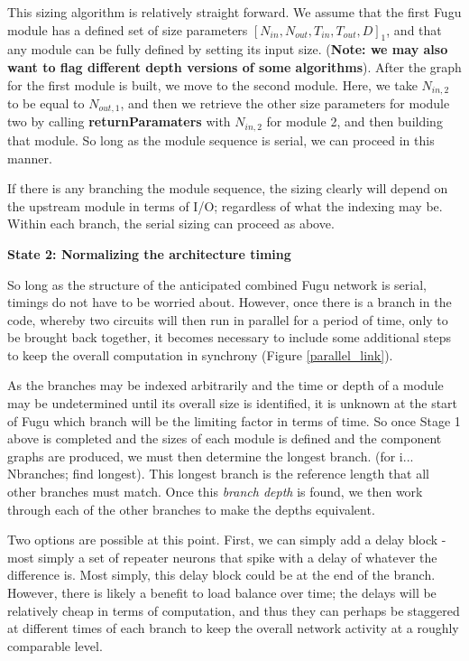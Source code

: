 \documentclass{article}
\begin{document}
This sizing algorithm is relatively straight forward.  We assume that the first Fugu module has a defined set of size parameters $[N_{in}, N_{out}, T_{in}, T_{out}, D]_1$, and that any module can be fully defined by setting its input size.  (\textbf{Note: we may also want to flag different depth versions of some algorithms}).  After the graph for the first module is built, we move to the second module.  Here, we take $N_{in,2}$ to be equal to $N_{out,1}$, and then we retrieve the other size parameters for module two by calling \textbf{returnParamaters} with $N_{in,2}$ for module 2, and then building that module.  So long as the module sequence is serial, we can proceed in this manner.  

If there is any branching the module sequence, the sizing clearly will depend on the upstream module in terms of I/O; regardless of what the indexing may be.  Within each branch, the serial sizing can proceed as above.  

\textbf{State 2: Normalizing the architecture timing}

So long as the structure of the anticipated combined Fugu network is serial, timings do not have to be worried about.  However, once there is a branch in the code, whereby two circuits will then run in parallel for a period of time, only to be brought back together, it becomes necessary to include some additional steps to keep the overall computation in synchrony (Figure \ref{parallel_link}).

As the branches may be indexed arbitrarily and the time or depth of a module may be undetermined until its overall size is identified, it is unknown at the start of Fugu which branch will be the limiting factor in terms of time.  So once Stage 1 above is completed and the sizes of each module is defined and the component graphs are produced, we must then determine the longest branch. (for i... Nbranches; find longest).  This longest branch is the reference length that all other branches must match.  Once this \textit{branch depth} is found, we then work through each of the other branches to make the depths equivalent.

Two options are possible at this point.  First, we can simply add a delay block - most simply a set of repeater neurons that spike with a delay of whatever the difference is.  Most simply, this delay block could be at the end of the branch. However, there is likely a benefit to load balance over time; the delays will be relatively cheap in terms of computation, and thus they can perhaps be staggered at different times of each branch to keep the overall network activity at a roughly comparable level.  
\end{document}
